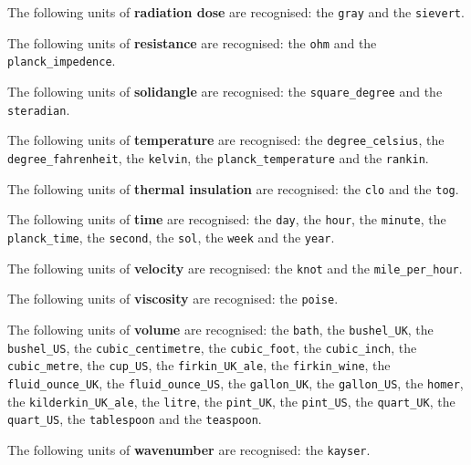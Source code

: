 \noindent The following units of {\bf radiation dose} are recognised:\newline
\noindent the {\tt gray} and the {\tt sievert}.\vspace{5mm}

\noindent The following units of {\bf resistance} are recognised:\newline
\noindent the {\tt ohm} and the {\tt planck\_\-impedence}.\vspace{5mm}

\noindent The following units of {\bf solidangle} are recognised:\newline
\noindent the {\tt square\_\-degree} and the {\tt steradian}.\vspace{5mm}

\noindent The following units of {\bf temperature} are recognised:\newline
\noindent the {\tt degree\_\-celsius}, the {\tt degree\_\-fahrenheit}, the {\tt kelvin}, the {\tt planck\_\-temperature} and the {\tt rankin}.\vspace{5mm}

\noindent The following units of {\bf thermal insulation} are recognised:\newline
\noindent the {\tt clo} and the {\tt tog}.\vspace{5mm}

\noindent The following units of {\bf time} are recognised:\newline
\noindent the {\tt day}, the {\tt hour}, the {\tt minute}, the {\tt planck\_\-time}, the {\tt second}, the {\tt sol}, the {\tt week} and the {\tt year}.\vspace{5mm}

\noindent The following units of {\bf velocity} are recognised:\newline
\noindent the {\tt knot} and the {\tt mile\_\-per\_\-hour}.\vspace{5mm}

\noindent The following units of {\bf viscosity} are recognised:\newline
\noindent the {\tt poise}.\vspace{5mm}

\noindent The following units of {\bf volume} are recognised:\newline
\noindent the {\tt bath}, the {\tt bushel\_\-UK}, the {\tt bushel\_\-US}, the {\tt cubic\_\-centimetre}, the {\tt cubic\_\-foot}, the {\tt cubic\_\-inch}, the {\tt cubic\_\-metre}, the {\tt cup\_\-US}, the {\tt firkin\_\-UK\_\-ale}, the {\tt firkin\_\-wine}, the {\tt fluid\_\-ounce\_\-UK}, the {\tt fluid\_\-ounce\_\-US}, the {\tt gallon\_\-UK}, the {\tt gallon\_\-US}, the {\tt homer}, the {\tt kilderkin\_\-UK\_\-ale}, the {\tt litre}, the {\tt pint\_\-UK}, the {\tt pint\_\-US}, the {\tt quart\_\-UK}, the {\tt quart\_\-US}, the {\tt tablespoon} and the {\tt teaspoon}.\vspace{5mm}

\noindent The following units of {\bf wavenumber} are recognised:\newline
\noindent the {\tt kayser}.\vspace{5mm}
